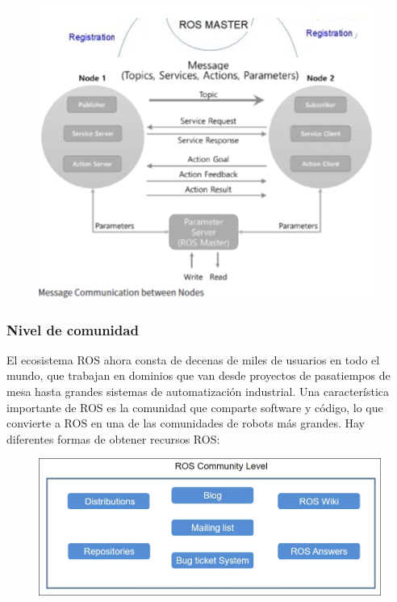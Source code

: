             \begin{figure}[htb]
                \centering
                \includegraphics[width=1.0\linewidth]{Main/Chapter3/Images3/n_s_a_14.png}
                \caption{}
                \label{f:Cap3_conceptos_14}
            \end{figure}   

               \newpage
               
            \subsubsection{Nivel de comunidad}
            
            El ecosistema ROS ahora consta de decenas de miles de usuarios en todo el mundo, que trabajan en dominios que van desde proyectos de pasatiempos de mesa hasta grandes sistemas de automatización industrial. 
            Una característica importante de ROS es la comunidad que comparte software y código, lo que convierte a ROS en una de las comunidades de robots más grandes. Hay diferentes formas de obtener recursos ROS:

            \begin{figure}[htb]
                \centering
                \includegraphics[width=0.9\linewidth]{Main/Chapter3/Images3/n_s_a_15.png}
                \caption{}
                \label{f:Cap3_conceptos_15}
            \end{figure}        
            

